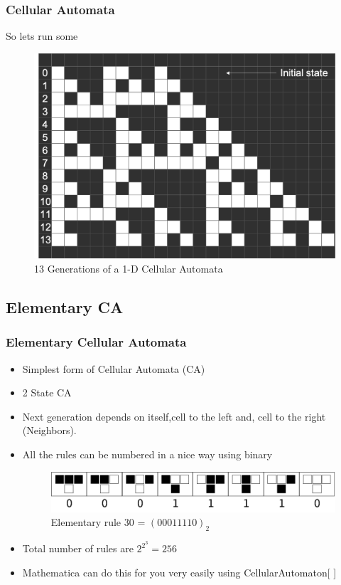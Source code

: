 \documentclass{beamer}
\begin{document}
\begin{frame}
    \frametitle{Cellular Automata}
    So lets run some 
    \begin{figure}
        \includegraphics[scale=0.42]{fig3.png}
        \caption{13 Generations of a 1-D Cellular Automata}
    \end{figure}
\end{frame}

\subsection{Elementary CA}
\begin{frame}
    \frametitle{Elementary Cellular Automata}
    \begin{itemize}
        \item Simplest form of Cellular Automata (CA)
        \item 2 State CA
        \item Next generation depends on itself,cell to the left and, cell to the right (Neighbors).
        \item All the rules can be numbered in a nice way using binary
        \begin{figure}[H]
            \includegraphics[scale=0.5]{fig1.png}
            \caption{Elementary rule 30 = $(00011110)_2$}
        \end{figure}
        \item Total number of rules are $2^{2^3} = 256$
        \item Mathematica can do this for you very easily using CellularAutomaton[ ]
    \end{itemize}
\end{frame}
\end{document}

